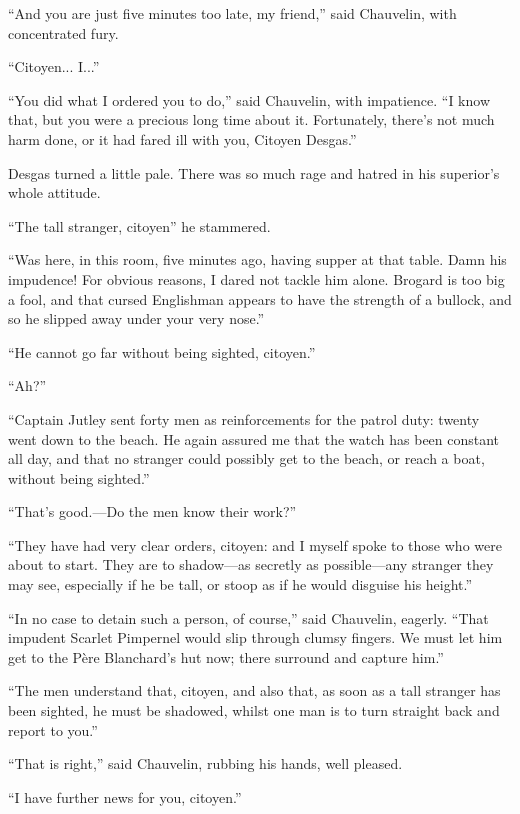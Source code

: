 \enquote{And you are just five minutes too late, my friend,} said Chauvelin, with concentrated fury.

\enquote{Citoyen... I...}

\enquote{You did what I ordered you to do,} said Chauvelin, with impatience. \enquote{I know that, but you were a precious long time about it. Fortunately, there's not much harm done, or it had fared ill with you, Citoyen Desgas.}

Desgas turned a little pale. There was so much rage and hatred in his superior's whole attitude.

\enquote{The tall stranger, citoyen\longdash} he stammered.

\enquote{Was here, in this room, five minutes ago, having supper at that table. Damn his impudence! For obvious reasons, I dared not tackle him alone. Brogard is too big a fool, and that cursed Englishman appears to have the strength of a bullock, and so he slipped away under your very nose.}

\enquote{He cannot go far without being sighted, citoyen.}

\enquote{Ah?}

\enquote{Captain Jutley sent forty men as reinforcements for the patrol duty: twenty went down to the beach. He again assured me that the watch has been constant all day, and that no stranger could possibly get to the beach, or reach a boat, without being sighted.}

\enquote{That's good.---Do the men know their work?}

\enquote{They have had very clear orders, citoyen: and I myself spoke to those who were about to start. They are to shadow---as secretly as possible---any stranger they may see, especially if he be tall, or stoop as if he would disguise his height.}

\enquote{In no case to detain such a person, of course,} said Chauvelin, eagerly. \enquote{That impudent Scarlet Pimpernel would slip through clumsy fingers. We must let him get to the Père Blanchard's hut now; there surround and capture him.}

\enquote{The men understand that, citoyen, and also that, as soon as a tall stranger has been sighted, he must be shadowed, whilst one man is to turn straight back and report to you.}

\enquote{That is right,} said Chauvelin, rubbing his hands, well pleased.

\enquote{I have further news for you, citoyen.}

